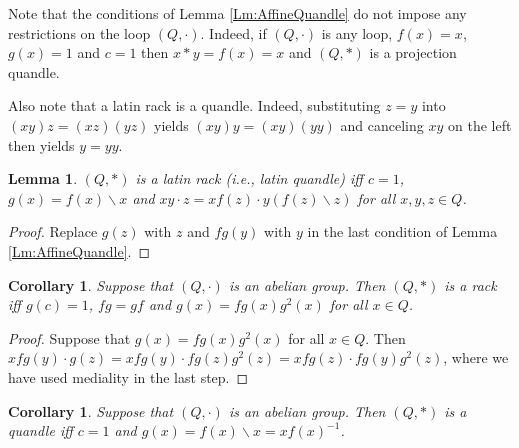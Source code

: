 \documentclass{amsart}
\def\ldiv{\backslash}
\theoremstyle{plain}
\newtheorem{corollary}[theorem]{Corollary}
\newtheorem{lemma}[theorem]{Lemma}
\theoremstyle{definition}
\begin{document}
Note that the conditions of Lemma \ref{Lm:AffineQuandle} do not impose any restrictions on the loop $(Q,\cdot)$. Indeed, if $(Q,\cdot)$ is any loop, $f(x)=x$, $g(x)=1$ and $c=1$ then $x*y=f(x) = x$ and $(Q,*)$ is a projection quandle.

Also note that a latin rack is a quandle. Indeed, substituting $z=y$ into $(xy)z=(xz)(yz)$ yields $(xy)y = (xy)(yy)$ and canceling $xy$ on the left then yields $y=yy$.

\begin{lemma}\label{Lm:AffineLatinQuandle}
$(Q,*)$ is a latin rack (i.e., latin quandle) iff $c=1$, $g(x)=f(x)\ldiv x$ and $xy\cdot z = xf(z)\cdot y(f(z)\ldiv z)$ for all $x,y,z\in Q$.
\end{lemma}
\begin{proof}
Replace $g(z)$ with $z$ and $fg(y)$ with $y$ in the last condition of Lemma \ref{Lm:AffineQuandle}.
\end{proof}

\begin{corollary}
Suppose that $(Q,\cdot)$ is an abelian group. Then $(Q,*)$ is a rack iff $g(c)=1$, $fg=gf$ and $g(x)=fg(x)g^2(x)$ for all $x\in Q$.
\end{corollary}
\begin{proof}
Suppose that $g(x)=fg(x)g^2(x)$ for all $x\in Q$. Then $xfg(y)\cdot g(z) = xfg(y)\cdot fg(z)g^2(z) =  xfg(z)\cdot fg(y)g^2(z)$, where we have used mediality in the last step.
\end{proof}

\begin{corollary}
Suppose that $(Q,\cdot)$ is an abelian group. Then $(Q,*)$ is a quandle iff $c=1$ and $g(x)=f(x)\ldiv x = xf(x)^{-1}$.
\end{corollary}
\end{document}
